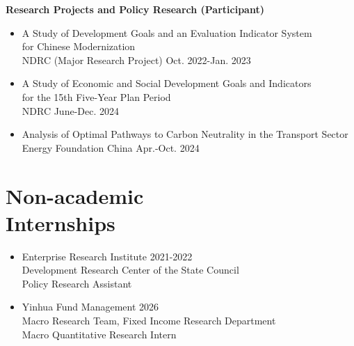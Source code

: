\documentclass[margin]{res}
\begin{document}
\begin{resume}
\textbf{Research Projects and Policy Research (Participant)}
\begin{itemize} \itemsep 5pt
  \item A Study of Development Goals and an Evaluation Indicator System\\
  for Chinese Modernization\\
  NDRC (Major Research Project) \hfill Oct. 2022-Jan. 2023
  \item A Study of Economic and Social Development Goals and Indicators\\
  for the 15th Five-Year Plan Period\\
  NDRC \hfill June-Dec. 2024
  \item Analysis of Optimal Pathways to Carbon Neutrality in the Transport Sector\\
  Energy Foundation China \hfill Apr.-Oct. 2024
\end{itemize}

\section{Non-academic\\Internships}
\begin{itemize} \itemsep -2pt
  \item Enterprise Research Institute \hfill 2021-2022\\
  Development Research Center of the State Council\\
  Policy Research Assistant
  \item Yinhua Fund Management \hfill 2026\\
  Macro Research Team, Fixed Income Research Department\\
  Macro Quantitative Research Intern
\end{itemize}


\end{resume}
\end{document}

